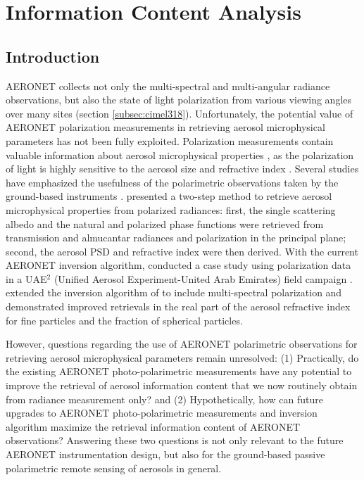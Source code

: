 \chapter{Information Content Analysis} \label{ch:info}

\section{Introduction}

AERONET collects not only the multi-spectral and multi-angular radiance
observations, but also the state of light polarization from various viewing
angles over many sites (section \ref{subsec:cimel318}). 
Unfortunately, the potential value of AERONET polarization
measurements in retrieving aerosol microphysical parameters has not been fully
exploited. Polarization measurements contain valuable information about aerosol
microphysical properties \citep{Mishchenko97,Cairns97}, as
the polarization of light is highly sensitive to the aerosol size and
refractive index \citep{Hansen74}. Several studies have emphasized the
usefulness of the polarimetric observations taken by the ground-based
instruments \citep{Cairns97, Boesche06, Emde10, Zeng08}.  
\citet{Vermeulen00} presented a two-step method to retrieve
aerosol microphysical properties from polarized radiances: first, the single
scattering albedo and the natural and polarized phase functions were retrieved
from transmission and almucantar radiances and polarization in the principal
plane; second, the aerosol PSD and refractive index were then derived. With the
current AERONET inversion algorithm, \citet{Dubovik06} conducted a case
study using polarization data in a UAE$^2$ (Unified Aerosol Experiment-United 
Arab Emirates) field campaign \citep{Reid08}. \citet{Li09} extended the
inversion algorithm of \citet{Dubovik06} to include multi-spectral
polarization and demonstrated improved retrievals in the real part of the aerosol
refractive index for fine particles and the fraction of spherical particles.

However, questions regarding the use of AERONET polarimetric observations for
retrieving aerosol microphysical parameters remain unresolved: (1) Practically,
do the existing AERONET photo-polarimetric measurements have any potential to
improve the retrieval of aerosol information content that we now routinely
obtain from radiance measurement only? and (2) Hypothetically, how can future
upgrades to AERONET photo-polarimetric measurements and inversion algorithm
maximize the retrieval information content of AERONET observations? 
Answering these two questions is not only relevant to the future AERONET
instrumentation design, but also for the ground-based passive polarimetric 
remote sensing of aerosols in general. 

